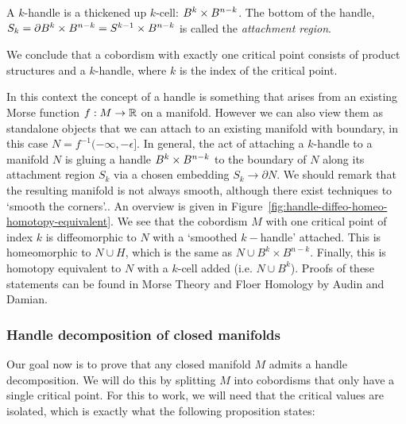 \begin{itemize}
\begin{definition}[$k$-handle]
    A $k$-handle is a thickened up $k$-cell: $B^{k} \times B^{n-k}$.
    The bottom of the handle, $S_k = \partial B^{k} \times B^{n-k} = S^{k-1} \times B^{n-k}$ is called the \emph{attachment region}.
    \end{definition}
\end{itemize}

We conclude that a cobordism with exactly one critical point consists of product structures and a $k$-handle, where $k$ is the index of the critical point.

    In this context the concept of a handle is something that arises from an existing Morse function $f:M \to  \mathbb{R}$ on a manifold.
    However we can also view them as standalone objects that we can attach to an existing manifold with boundary, in this case $N = f^{-1}(-\infty, -\epsilon]$.
    In general, the act of attaching a $k$-handle to a manifold $N$ is gluing a handle $B^{k} \times B^{n-k}$ to the boundary of $N$ along its attachment region $S_k$ via a chosen embedding $S_k \to  \partial N$.
    We should remark that the resulting manifold is not always smooth, although there exist techniques to `smooth the corners'..
    An overview is given in Figure~\ref{fig:handle-diffeo-homeo-homotopy-equivalent}.
    We see that the cobordism $M$ with one critical point of index $k$ is diffeomorphic to $N$ with a `smoothed $k-$handle' attached.
    This is homeomorphic to $N \cup H$, which is the same as $N \cup B^{k} \times B^{n-k}$.
    Finally, this is homotopy equivalent to $N$ with a $k$-cell added (i.e. $N \cup B^{k}$).
    Proofs of these statements can be found in Morse Theory and Floer Homology by Audin and Damian.

\begin{figure}[H]
    \centering
\end{figure}

\subsubsection*{Handle decomposition of closed manifolds}

Our goal now is to prove that any closed manifold $M$ admits a handle decomposition.
We will do this by splitting $M$ into cobordisms that only have a single critical point.
For this to work, we will need that the critical values are isolated, which is exactly what the following proposition states:

